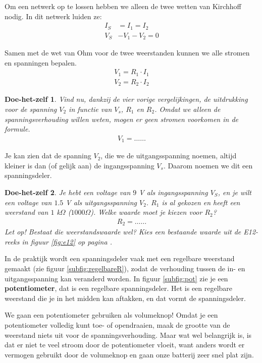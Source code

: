\documentclass{article}
\newtheorem{DIY}{Doe-het-zelf}
\begin{document}
			Om een netwerk op te lossen hebben we alleen de twee wetten van Kirchhoff nodig. In dit netwerk luiden ze:
			\begin{align}
			    I_S &= I_1 = I_2 \\
			    V_S &- V_1 -V_2 = 0 
			\end{align}

			Samen met de wet van Ohm voor de twee weerstanden kunnen we alle stromen en spanningen bepalen.
			\begin{align}
			    V_1 = R_1 \cdot I_1 \\
			    V_2 = R_2 \cdot I_2
			\end{align}

			\begin{DIY} Vind nu, dankzij de vier vorige vergelijkingen, de uitdrukking voor de spanning $V_2$ in functie van $V_s$, $R_1$ en $R_2$. Omdat we alleen de spanningsverhouding willen weten, mogen er geen stromen voorkomen in de formule.
			\begin{align*}
			    V_1 = \ldots\ldots
			\end{align*}
			\end{DIY}
			Je kan zien dat de spanning $V_2$, die we de uitgangsspanning noemen, altijd kleiner is dan (of gelijk aan) de ingangsspanning $V_s$. Daarom noemen we dit een spanningsdeler.
			\begin{DIY}Je hebt een voltage van $9$ V als ingangsspanning $V_S$, en je wilt een voltage van $1.5$ V als uitgangsspanning $V_2$. $R_1$ is al gekozen en heeft een weerstand van $1$ k$\Omega$ ($1000 \Omega$). Welke waarde moet je kiezen voor $R_2$?
			\begin{align*}
			    R_2 = \ldots\ldots
			\end{align*}
			Let op! Bestaat die weerstandswaarde wel? Kies een bestaande waarde uit de E12-reeks in figuur \ref{fig:e12} op pagina \pageref{fig:e12}.
			\end{DIY}
			In de praktijk wordt een spanningsdeler vaak met een regelbare weerstand gemaakt (zie figuur \ref{subfig:regelbareR}), zodat de verhouding tussen de in- en uitgangsspanning kan veranderd worden. In figuur \ref{subfig:pot} zie je een \textbf{potentiometer}, dat is een regelbare spanningsdeler. Het is een regelbare weerstand die je in het midden kan aftakken, en dat vormt de spanningsdeler.

			We gaan een potentiometer gebruiken als volumeknop! Omdat je een potentiometer volledig kunt toe- of opendraaien, maak de grootte van de weerstand niets uit voor de spanningsverhouding. Maar wat wel belangrijk is, is dat er niet te veel stroom door de potentiometer vloeit, want anders wordt er vermogen gebruikt door de volumeknop en gaan onze batterij zeer snel plat zijn. 
\end{document}
